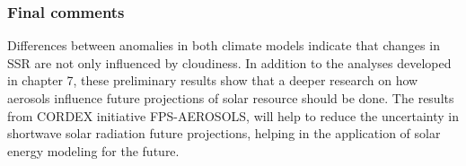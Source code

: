 \begin{subappendices}
\subsubsection{Final comments}

Differences between anomalies in both climate models indicate that changes in SSR are not only influenced by cloudiness. In addition to the analyses developed in chapter 7, these preliminary results show that a deeper research on how aerosols influence future projections of solar resource should be done. The results from CORDEX initiative FPS-AEROSOLS, will help to reduce the uncertainty in shortwave solar radiation future projections, helping in the application of solar energy modeling for the future. 

\end{subappendices}

% 